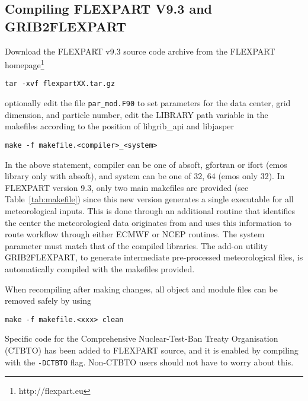 \documentclass{egu}                  %
\begin{document}
\subsection{Compiling FLEXPART V9.3 and GRIB2FLEXPART}

Download the FLEXPART v9.3 source code archive from the FLEXPART
homepage\footnote{http://flexpart.eu}

\begin{small}
\begin{verbatim}
tar -xvf flexpartXX.tar.gz
\end{verbatim}
\end{small}
optionally edit the file \verb|par_mod.F90| to set parameters for the data center, grid
dimension, and particle number, edit the LIBRARY path variable in the makefiles
according to the position of libgrib\_api and libjasper
\begin{small}
\begin{verbatim}
make -f makefile.<compiler>_<system>
\end{verbatim}
\end{small}
In the above statement, compiler can be one of absoft, gfortran or ifort (emos library only with
absoft), and system can be one of 32, 64 (emos only 32). In FLEXPART version 9.3, only two main makefiles are provided (see  Table~\ref{tab:makefile}) since this new version generates a single executable for all meteorological inputs. This is done through an additional routine that identifies the center the meteorological data originates from and uses this information to route workflow through either ECMWF or NCEP routines. The system parameter must
match that of the compiled libraries. The add-on utility GRIB2FLEXPART, to generate intermediate pre-processed meteorological files, is automatically compiled with the makefiles provided.

When recompiling after making changes, all object and module files can be
removed safely by using
\begin{small}
\begin{verbatim}
make -f makefile.<xxx> clean
\end{verbatim}
\end{small}

Specific code for the Comprehensive Nuclear-Test-Ban Treaty Organisation (CTBTO) has been added to FLEXPART source, and it is enabled by compiling with the \verb|-DCTBTO| flag. Non-CTBTO users should not have to worry about this. 

\end{document}
